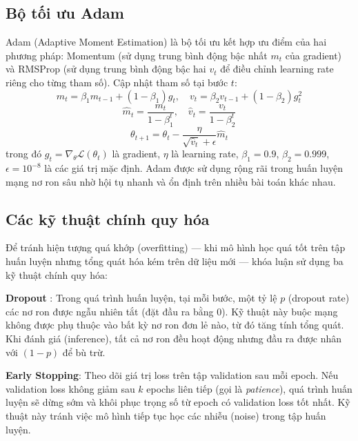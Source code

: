 \subsection{Bộ tối ưu Adam}

Adam (Adaptive Moment Estimation) \cite{kingma2014adam} là bộ tối ưu kết hợp ưu điểm của hai phương pháp: Momentum (sử dụng trung bình động bậc nhất $m_t$ của gradient) và RMSProp (sử dụng trung bình động bậc hai $v_t$ để điều chỉnh learning rate riêng cho từng tham số). Cập nhật tham số tại bước $t$:
\begin{equation}
    m_t = \beta_1 m_{t-1} + (1-\beta_1) g_t, \quad v_t = \beta_2 v_{t-1} + (1-\beta_2) g_t^2
\end{equation}
\begin{equation}
    \hat{m}_t = \frac{m_t}{1-\beta_1^t}, \quad \hat{v}_t = \frac{v_t}{1-\beta_2^t}
\end{equation}
\begin{equation}
    \theta_{t+1} = \theta_t - \frac{\eta}{\sqrt{\hat{v}_t} + \epsilon} \hat{m}_t
\end{equation}
trong đó $g_t = \nabla_\theta \mathcal{L}(\theta_t)$ là gradient, $\eta$ là learning rate, $\beta_1 = 0.9$, $\beta_2 = 0.999$, $\epsilon = 10^{-8}$ là các giá trị mặc định. Adam được sử dụng rộng rãi trong huấn luyện mạng nơ ron sâu nhờ hội tụ nhanh và ổn định trên nhiều bài toán khác nhau.

\subsection{Các kỹ thuật chính quy hóa}

Để tránh hiện tượng quá khớp (overfitting) — khi mô hình học quá tốt trên tập huấn luyện nhưng tổng quát hóa kém trên dữ liệu mới — khóa luận sử dụng ba kỹ thuật chính quy hóa:

\textbf{Dropout} \cite{srivastava2014dropout}: Trong quá trình huấn luyện, tại mỗi bước, một tỷ lệ $p$ (dropout rate) các nơ ron được ngẫu nhiên tắt (đặt đầu ra bằng 0). Kỹ thuật này buộc mạng không được phụ thuộc vào bất kỳ nơ ron đơn lẻ nào, từ đó tăng tính tổng quát. Khi đánh giá (inference), tất cả nơ ron đều hoạt động nhưng đầu ra được nhân với $(1-p)$ để bù trừ.

\textbf{Early Stopping}: Theo dõi giá trị loss trên tập validation sau mỗi epoch. Nếu validation loss không giảm sau $k$ epochs liên tiếp (gọi là \textit{patience}), quá trình huấn luyện sẽ dừng sớm và khôi phục trọng số từ epoch có validation loss tốt nhất. Kỹ thuật này tránh việc mô hình tiếp tục học các nhiễu (noise) trong tập huấn luyện.

